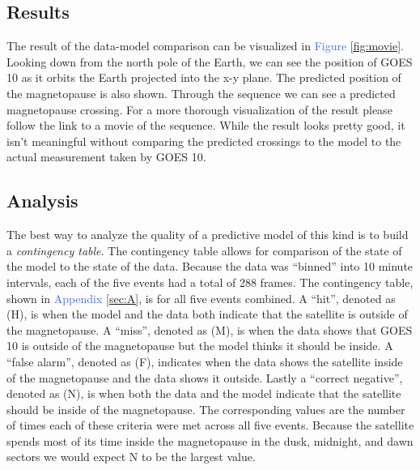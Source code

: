 \documentclass[12pt, letterpaper]{article}
\begin{document}
\subsection{Results}
The result of the data-model comparison can be visualized in \textcolor{RoyalBlue}{Figure \ref{fig:movie}}. Looking down from the north pole of the Earth, we can see the position of GOES 10 as it orbits the Earth projected into the x-y plane. The predicted position of the magnetopause is also shown. Through the sequence we can see a predicted magnetopause crossing. For a more thorough visualization of the result please follow the link to a movie of the sequence. While the result looks pretty good, it isn't meaningful without comparing the predicted crossings to the model to the actual measurement taken by GOES 10.

\subsection{Analysis}
The best way to analyze the quality of a predictive model of this kind is to build a \emph{contingency table}. The contingency table allows for comparison of the state of the model to the state of the data. Because the data was \enquote{binned} into 10 minute intervals, each of the five events had a total of 288 frames. The contingency table, shown in \textcolor{RoyalBlue}{Appendix \ref{sec:A}}, is for all five events combined. A \enquote{hit}, denoted as (H), is when the model and the data both indicate that the satellite is outside of the magnetopause. A \enquote{miss}, denoted as (M), is when the data shows that GOES 10 is outside of the magnetopause but the model thinks it should be inside. A \enquote{false alarm}, denoted as (F), indicates when the data shows the satellite inside of the magnetopause and the data shows it outside. Lastly a \enquote{correct negative}, denoted as (N), is when both the data and the model indicate that the satellite should be inside of the magnetopause. The corresponding values are the number of times each of these criteria were met across all five events. Because the satellite spends most of its time inside the magnetopause in the dusk, midnight, and dawn sectors we would expect N to be the largest value. 
\end{document}
